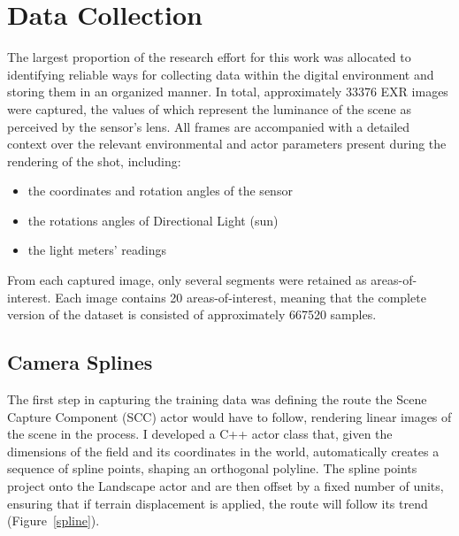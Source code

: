 \section{Data Collection}
\label{DC}

The largest proportion of the research effort for this work was allocated to identifying reliable ways for collecting data within the digital environment and storing them in an organized manner. In total, approximately 33376 EXR images were captured, the values of which represent the luminance of the scene as perceived by the sensor's lens. All frames are accompanied with a detailed context over the relevant environmental and actor parameters present during the rendering of the shot, including:
\begin{itemize}
    \item the coordinates and rotation angles of the sensor
    \item the rotations angles of Directional Light (sun)
    \item the light meters' readings
    
\end{itemize}

From each captured image, only several segments were retained as areas-of-interest. Each image contains 20 areas-of-interest, meaning that the complete version of the dataset is consisted of approximately 667520 samples.

\subsection{Camera Splines}

The first step in capturing the training data was defining the route the Scene Capture Component (SCC) actor would have to follow, rendering linear images of the scene in the process. I developed a C++ actor class that, given the dimensions of the field and its coordinates in the world, automatically creates a sequence of spline points, shaping an orthogonal polyline. The spline points project onto the Landscape actor and are then offset by a fixed number of units, ensuring that if terrain displacement is applied, the route will follow its trend (Figure~\ref{spline}).

